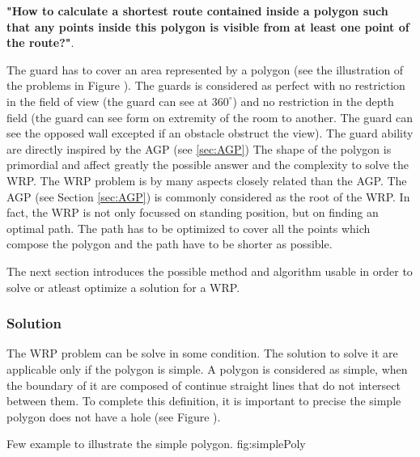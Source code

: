 \textbf{"How to calculate a shortest route contained inside a polygon such that any points inside this polygon is visible from at least one point of the route?"}.  

The guard has to cover an area represented by a polygon (see the illustration of the problems in Figure ). The guards is considered as perfect with no restriction in the field of view (the guard can see at $360^\circ$) and no restriction in the depth field (the guard can see form on extremity of the room to another. The guard can see the opposed wall excepted if an obstacle obstruct the view). The guard ability are directly inspired by the AGP (see \ref{sec:AGP})
The shape of the polygon is primordial and affect greatly the possible answer and the complexity to solve the WRP.
The WRP problem is by many aspects closely related than the AGP. The AGP (see Section \ref{sec:AGP}) is commonly considered as the root of the WRP.
 In fact, the WRP is not only focussed on standing position, but on finding an optimal path. The path has to be optimized to cover all the points which compose the polygon  and the path have to be shorter as possible.
 
 The next section introduces the possible method and algorithm usable in order to solve or atleast optimize a solution for a WRP.
 



 
\subsubsection{Solution} 

The WRP problem can be solve in some condition. The solution to solve it are applicable only if the polygon is simple. A polygon is considered as simple, when the boundary of it are composed of continue straight lines that do not intersect between them. To complete this definition, it is important to precise the simple polygon does not have a hole (see Figure ). 
 \begin{mfigures}[!]
{Few example to illustrate the simple polygon. }{fig:simplePoly} \centering
{}
\hspace{1cm}
\hspace{1cm}
\end{mfigures}	

